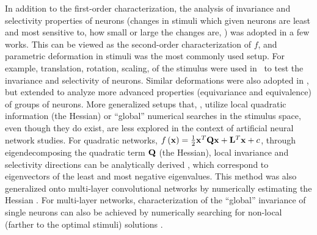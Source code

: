 \documentclass[10pt,twocolumn,letterpaper]{article}
\begin{document}
In addition to the first-order characterization, the analysis of invariance and selectivity properties of neurons (\eg changes in stimuli which given neurons are least and most sensitive to, how small or large the changes are, \etc) was adopted in a few works. This can be viewed as the second-order characterization of $f$, and parametric deformation in stimuli was the most commonly used setup.
For example, translation, rotation, scaling, \etc of the stimulus were used in~\cite{goodfellow2009measuring, zeiler2014visualizing} to test the invariance and selectivity of neurons.
Similar deformations were also adopted in \cite{lenc2014understanding}, but extended to analyze more advanced properties (\ie equivariance and equivalence) of groups of neurons.
More generalized setups that, \eg, utilize local quadratic information (\ie the Hessian) or ``global'' numerical searches in the stimulus space, even though they do exist, are less explored in the context of artificial neural network studies.
For quadratic networks, \ie $f\left({\bf{x}}\right) = \frac{1}{2}{\bf{x}}^{T}{\bf{Qx}}+{\bf{L}}^{T}{\bf{x}}+c$, through eigendecomposing the quadratic term $\bf{Q}$ (\ie the Hessian), local invariance and selectivity directions can be analytically derived \cite{berkes2006analysis}, which correspond to eigenvectors of the least and most negative eigenvalues.
This method was also generalized onto multi-layer convolutional networks by numerically estimating the Hessian \cite{ngiam2010tiled}.
For multi-layer networks, characterization of the ``global'' invariance of single neurons can also be achieved by numerically searching for non-local (\ie farther to the optimal stimuli) solutions \cite{erhan2010understanding}.


\end{document}
